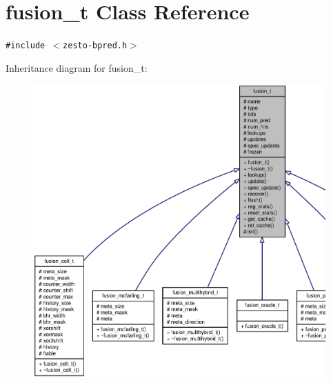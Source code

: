 \section{fusion\_\-t Class Reference}
\label{classfusion__t}
{\tt \#include $<$zesto-bpred.h$>$}

Inheritance diagram for fusion\_\-t:\nopagebreak
\begin{figure}[H]
\begin{center}
\leavevmode
\includegraphics[width=400pt]{classfusion__t__inherit__graph}
\end{center}
\end{figure}
